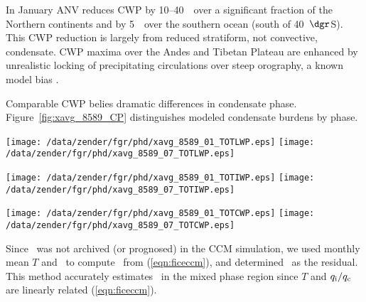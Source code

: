 \documentclass[agums]{aguplus}
\begin{document}
In January ANV reduces CWP by 10--40~\gxmS\ over a significant
fraction of the Northern continents and by 5~\gxmS\ over the southern
ocean (south of 40~$\dgr$S).
This CWP reduction is largely from reduced stratiform, not convective,
condensate.
CWP maxima over the Andes and Tibetan Plateau are enhanced by
unrealistic locking of precipitating circulations over steep
orography, a known model bias \cite[]{HBK94}. 

Comparable CWP belies dramatic differences in condensate phase.
Figure~\ref{fig:xavg_8589_CP} distinguishes modeled condensate
burdens by phase.
\begin{figure*}
\begin{center}
\texttt{[image: /data/zender/fgr/phd/xavg\_8589\_01\_TOTLWP.eps]}%
\texttt{[image: /data/zender/fgr/phd/xavg\_8589\_07\_TOTLWP.eps]}%

\texttt{[image: /data/zender/fgr/phd/xavg\_8589\_01\_TOTIWP.eps]}%
\texttt{[image: /data/zender/fgr/phd/xavg\_8589\_07\_TOTIWP.eps]}%

\texttt{[image: /data/zender/fgr/phd/xavg\_8589\_01\_TOTCWP.eps]}%
\texttt{[image: /data/zender/fgr/phd/xavg\_8589\_07\_TOTCWP.eps]}%
\end{center}
\caption[Zonal average column condensate burdens from
1985--1989 January and July simulations by CCM and ANV]{
Zonal average column condensate burdens (\gxmS) from
1985--1989 (left) January and (right) July simulations by (solid) CCM
and (dashed) ANV of (a,b) LWP, (c,d) IWP, and (e,f) CWP.   
\label{fig:xavg_8589_CP}}   
\end{figure*}
Since \qi\ was not archived (or prognosed) in the CCM simulation, we
used monthly mean $T$ and \qc\ to compute \qi\ from
(\ref{eqn:ficeccm}), and determined \ql\ as the residual.
This method accurately estimates \qi\ in the mixed phase region
since $T$ and $\mbox{$q_\mathrm{i}$}/\mbox{$q_\mathrm{c}$}$ are linearly related (\ref{eqn:ficeccm}).
\end{document}
